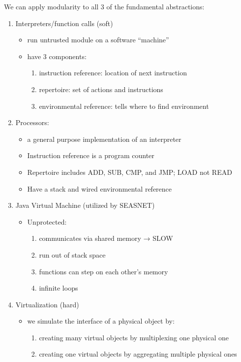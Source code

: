 \documentclass[../../lecture_notes.tex]{subfiles}
\begin{document}
We can apply modularity to all 3 of the fundamental abstractions:
\begin{enumerate}
\item Interpreters/function calls (soft)
		\begin{itemize}
			\item run untrusted module on a software “machine”
			\item have  3 components:
			\begin{enumerate}
				\item instruction reference: location of next instruction
				\item repertoire: set of actions and instructions
				\item environmental reference: tells where to find environment
			\end{enumerate}
		\end{itemize}
	\item Processors:
		\begin{itemize}
			\item a general purpose implementation of an interpreter
			\item Instruction reference is a program counter
			\item Repertoire includes ADD, SUB, CMP, and JMP; LOAD not READ
			\item Have a stack and wired environmental reference
		\end{itemize}
	\item Java Virtual Machine (utilized by SEASNET)
		\begin{itemize}
			\item Unprotected:
				\begin{enumerate}
				\item communicates via shared memory → SLOW
				\item run out of stack space
				\item functions can step on each other’s memory
				\item infinite loops
			\end{enumerate}
		\end{itemize}
\item Virtualization (hard)
	\begin{itemize}
		\item we simulate the interface of a physical object by:
			\begin{enumerate}
				\item creating many virtual objects by multiplexing one physical one
				\item creating one virtual objects by aggregating multiple physical ones

\end{enumerate}
\end{itemize}
\end{enumerate}
\end{document}
